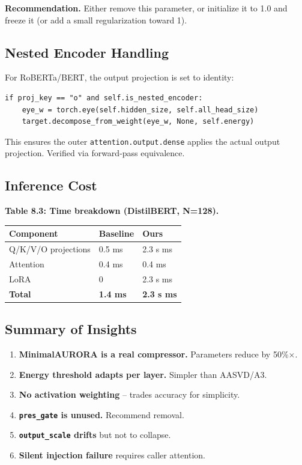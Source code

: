 \textbf{Recommendation.} Either remove this parameter, or initialize it to 
1.0 and freeze it (or add a small regularization toward 1).

\subsection{Nested Encoder Handling}

For RoBERTa/BERT, the output projection is set to identity:

\begin{lstlisting}
if proj_key == "o" and self.is_nested_encoder:
    eye_w = torch.eye(self.hidden_size, self.all_head_size)
    target.decompose_from_weight(eye_w, None, self.energy)
\end{lstlisting}

This ensures the outer \texttt{attention.output.dense} applies the actual 
output projection. Verified via forward-pass equivalence.

\subsection{Inference Cost}

\textbf{Table 8.3: Time breakdown (DistilBERT, N=128).}

\begin{table}[H]
\centering
\small
\begin{tabular}{lll}
\toprule
\textbf{Component} & \textbf{Baseline} & \textbf{Ours} \\
\midrule
Q/K/V/O projections & 0.5 ms & 2.3 s ms \\
Attention & 0.4 ms & 0.4 ms \\
LoRA & 0 & 2.3 s ms \\
\textbf{Total} & \textbf{1.4 ms} & \textbf{2.3 s ms} \\
\bottomrule
\end{tabular}
\end{table}

\subsection{Summary of Insights}

\begin{enumerate}
\item \textbf{MinimalAURORA is a real compressor.} Parameters reduce by 50\%$\times$.
\item \textbf{Energy threshold adapts per layer.} Simpler than AASVD/A3.
\item \textbf{No activation weighting} -- trades accuracy for simplicity.
\item \textbf{\texttt{pres\_gate} is unused.} Recommend removal.
\item \textbf{\texttt{output\_scale} drifts} but not to collapse.
\item \textbf{Silent injection failure} requires caller attention.

\end{enumerate}


